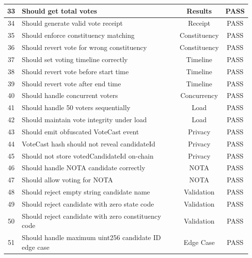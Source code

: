 \documentclass[oneside,a4paper,12pt]{book}
\begin{document}
\begin{longtable}{|c|p{8.5cm}|c|c|}
\hline
33 & Should get total votes & Results & \textcolor{green!60!black}{PASS} \\
\hline
34 & Should generate valid vote receipt & Receipt & \textcolor{green!60!black}{PASS} \\
\hline
35 & Should enforce constituency matching & Constituency & \textcolor{green!60!black}{PASS} \\
\hline
36 & Should revert vote for wrong constituency & Constituency & \textcolor{green!60!black}{PASS} \\
\hline
37 & Should set voting timeline correctly & Timeline & \textcolor{green!60!black}{PASS} \\
\hline
38 & Should revert vote before start time & Timeline & \textcolor{green!60!black}{PASS} \\
\hline
39 & Should revert vote after end time & Timeline & \textcolor{green!60!black}{PASS} \\
\hline
40 & Should handle concurrent voters & Concurrency & \textcolor{green!60!black}{PASS} \\
\hline
41 & Should handle 50 voters sequentially & Load & \textcolor{green!60!black}{PASS} \\
\hline
42 & Should maintain vote integrity under load & Load & \textcolor{green!60!black}{PASS} \\
\hline
43 & Should emit obfuscated VoteCast event & Privacy & \textcolor{green!60!black}{PASS} \\
\hline
44 & VoteCast hash should not reveal candidateId & Privacy & \textcolor{green!60!black}{PASS} \\
\hline
45 & Should not store votedCandidateId on-chain & Privacy & \textcolor{green!60!black}{PASS} \\
\hline
46 & Should handle NOTA candidate correctly & NOTA & \textcolor{green!60!black}{PASS} \\
\hline
47 & Should allow voting for NOTA & NOTA & \textcolor{green!60!black}{PASS} \\
\hline
48 & Should reject empty string candidate name & Validation & \textcolor{green!60!black}{PASS} \\
\hline
49 & Should reject candidate with zero state code & Validation & \textcolor{green!60!black}{PASS} \\
\hline
50 & Should reject candidate with zero constituency code & Validation & \textcolor{green!60!black}{PASS} \\
\hline
51 & Should handle maximum uint256 candidate ID edge case & Edge Case & \textcolor{green!60!black}{PASS} \\

\end{longtable}
\end{document}
